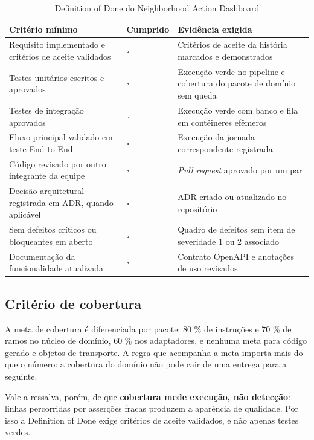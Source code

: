 \documentclass[12pt,a4paper,oneside]{article}
\newcommand{\fonte}[1]{\par\vspace{5pt}{\footnotesize\singlespacing Fonte: #1\par}}
\newcommand{\cab}[1]{\textbf{\footnotesize #1}}
\newcommand{\vazio}{$\square$}
\begin{document}
\begin{table}[H]
\centering
\caption{Definition of Done do Neighborhood Action Dashboard}
\label{tab:dod}
{\small\singlespacing
\begin{tabularx}{\textwidth}{X C{1.8cm} L{5.4cm}}
\toprule
\cab{Critério mínimo} & \cab{Cumprido} & \cab{Evidência exigida} \\
\midrule
Requisito implementado e critérios de aceite validados & \vazio & Critérios de
aceite da história marcados e demonstrados \\
Testes unitários escritos e aprovados & \vazio & Execução verde no pipeline e
cobertura do pacote de domínio sem queda \\
Testes de integração aprovados & \vazio & Execução verde com banco e fila em
contêineres efêmeros \\
Fluxo principal validado em teste End-to-End & \vazio & Execução da jornada
correspondente registrada \\
Código revisado por outro integrante da equipe & \vazio & \emph{Pull request}
aprovado por um par \\
Decisão arquitetural registrada em ADR, quando aplicável & \vazio & ADR criado
ou atualizado no repositório \\
Sem defeitos críticos ou bloqueantes em aberto & \vazio & Quadro de defeitos sem
item de severidade 1 ou 2 associado \\
Documentação da funcionalidade atualizada & \vazio & Contrato OpenAPI e
anotações de uso revisados \\
\bottomrule
\end{tabularx}}
\fonte{elaborado pelos autores (2026), a partir do modelo proposto na GS2026.2.}
\end{table}

\subsection{Critério de cobertura}

A meta de cobertura é diferenciada por pacote: 80 \% de instruções e 70 \% de
ramos no núcleo de domínio, 60 \% nos adaptadores, e nenhuma meta para código
gerado e objetos de transporte. A regra que acompanha a meta importa mais do que
o número: a cobertura do domínio não pode cair de uma entrega para a seguinte.

Vale a ressalva, porém, de que \textbf{cobertura mede execução, não detecção}:
linhas percorridas por asserções fracas produzem a aparência de qualidade. Por
isso a Definition of Done exige critérios de aceite validados, e não apenas
testes verdes.
\end{document}
